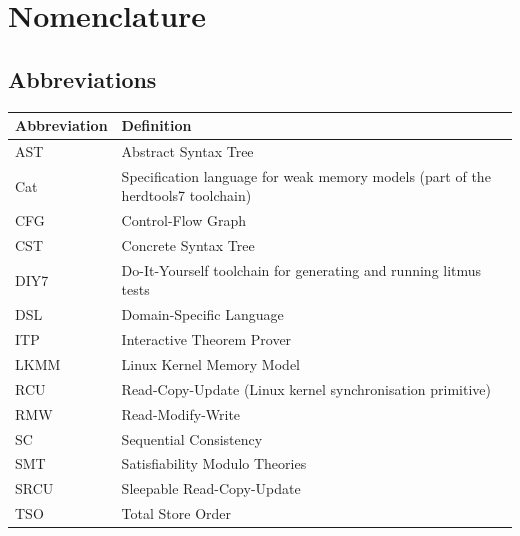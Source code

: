 \chapter*{Nomenclature}

\section*{Abbreviations}
\begin{longtable}{p{2.5cm}p{8cm}}
    \toprule
    Abbreviation & Definition \\
    \midrule\endhead %
    AST   & Abstract Syntax Tree \\
    Cat   & Specification language for weak memory models (part of the herdtools7 toolchain) \\
    CFG   & Control-Flow Graph \\
    CST   & Concrete Syntax Tree \\
    DIY7  & Do-It-Yourself toolchain for generating and running litmus tests \\
    DSL   & Domain-Specific Language \\
    ITP   & Interactive Theorem Prover \\
    LKMM  & Linux Kernel Memory Model \\
    RCU   & Read-Copy-Update (Linux kernel synchronisation primitive) \\
    RMW   & Read-Modify-Write \\
    SC    & Sequential Consistency \\
    SMT   & Satisfiability Modulo Theories \\
    SRCU  & Sleepable Read-Copy-Update \\
    TSO   & Total Store Order \\
    \bottomrule
\end{longtable}

